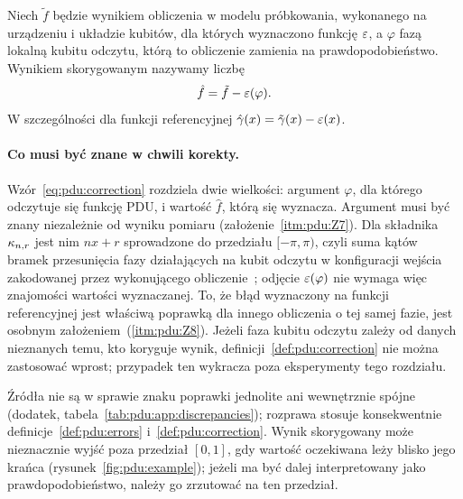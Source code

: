\begin{Definition}\label{def:pdu:correction}
Niech $\tilde{f}$ będzie wynikiem obliczenia w modelu próbkowania, wykonanego na urządzeniu i układzie kubitów, dla których wyznaczono funkcję $\varepsilon$, a $\varphi$ fazą lokalną kubitu odczytu, którą to obliczenie zamienia na prawdopodobieństwo.
Wynikiem skorygowanym nazywamy liczbę
\begin{equation}\label{eq:pdu:correction}
\hat{f}=\tilde{f}-\varepsilon(\varphi).
\end{equation}
W szczególności dla funkcji referencyjnej $\hat{\gamma}(x)=\tilde{\gamma}(x)-\varepsilon(x)$.
\end{Definition}

\paragraph{Co musi być znane w chwili korekty.}\label{par:pdu:known-argument}
Wzór~\eqref{eq:pdu:correction} rozdziela dwie wielkości: argument $\varphi$, dla którego odczytuje się funkcję PDU, i wartość $\hat{f}$, którą się wyznacza.
Argument musi być znany niezależnie od wyniku pomiaru (założenie~\ref{itm:pdu:Z7}).
Dla składnika $\kappa_{n,r}$ jest nim $nx+r$ sprowadzone do przedziału $[-\pi,\pi)$, czyli suma kątów bramek przesunięcia fazy działających na kubit odczytu w konfiguracji wejścia zakodowanej przez wykonującego obliczenie~\cite{werner_magisterka_2022}; odjęcie $\varepsilon(\varphi)$ nie wymaga więc znajomości wartości wyznaczanej.
To, że błąd wyznaczony na funkcji referencyjnej jest właściwą poprawką dla innego obliczenia o tej samej fazie, jest osobnym założeniem~(\ref{itm:pdu:Z8}).
Jeżeli faza kubitu odczytu zależy od danych nieznanych temu, kto koryguje wynik, definicji~\ref{def:pdu:correction} nie można zastosować wprost; przypadek ten wykracza poza eksperymenty tego rozdziału.

Źródła nie są w sprawie znaku poprawki jednolite ani wewnętrznie spójne (dodatek, tabela~\ref{tab:pdu:app:discrepancies}); rozprawa stosuje konsekwentnie definicje~\ref{def:pdu:errors} i~\ref{def:pdu:correction}.
Wynik skorygowany może nieznacznie wyjść poza przedział $[0,1]$, gdy wartość oczekiwana leży blisko jego krańca (rysunek~\ref{fig:pdu:example}); jeżeli ma być dalej interpretowany jako prawdopodobieństwo, należy go zrzutować na ten przedział.

